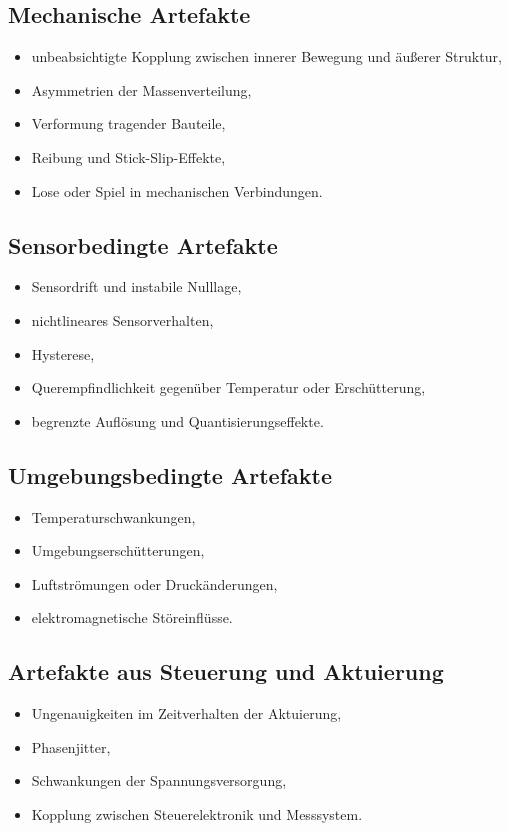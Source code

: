 \documentclass[12pt,a4paper]{report}
\begin{document}
\subsection{Mechanische Artefakte}

\begin{itemize}
\item unbeabsichtigte Kopplung zwischen innerer Bewegung und äußerer
      Struktur,
\item Asymmetrien der Massenverteilung,
\item Verformung tragender Bauteile,
\item Reibung und Stick-Slip-Effekte,
\item Lose oder Spiel in mechanischen Verbindungen.
\end{itemize}

\subsection{Sensorbedingte Artefakte}

\begin{itemize}
\item Sensordrift und instabile Nulllage,
\item nichtlineares Sensorverhalten,
\item Hysterese,
\item Querempfindlichkeit gegenüber Temperatur oder Erschütterung,
\item begrenzte Auflösung und Quantisierungseffekte.
\end{itemize}

\subsection{Umgebungsbedingte Artefakte}

\begin{itemize}
\item Temperaturschwankungen,
\item Umgebungserschütterungen,
\item Luftströmungen oder Druckänderungen,
\item elektromagnetische Störeinflüsse.
\end{itemize}

\subsection{Artefakte aus Steuerung und Aktuierung}

\begin{itemize}
\item Ungenauigkeiten im Zeitverhalten der Aktuierung,
\item Phasenjitter,
\item Schwankungen der Spannungsversorgung,
\item Kopplung zwischen Steuerelektronik und Messsystem.
\end{itemize}
\end{document}
